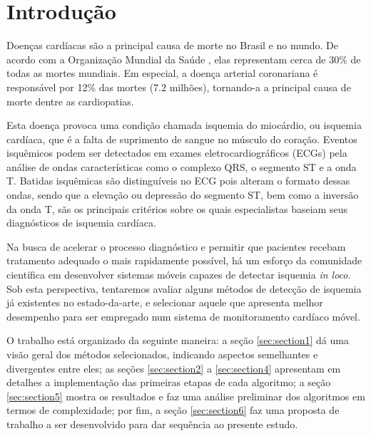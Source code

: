 
\section*{Introdução}
\label{sec:intro}

Doenças cardíacas são a principal causa de morte no Brasil e no mundo. De acordo com a Organização Mundial da Saúde \cite{Who04}, elas representam cerca de 30\% de todas as mortes mundiais. Em especial, a doença arterial coronariana é responsável por 12\% das mortes (7.2 milhões), tornando-a a principal causa de morte dentre as cardiopatias.

Esta doença provoca uma condição chamada isquemia do miocárdio, ou isquemia cardíaca, que é a falta de suprimento de sangue no músculo do coração. Eventos isquêmicos podem ser detectados em exames eletrocardiográficos (ECGs) pela análise de ondas características como o complexo QRS, o segmento ST e a onda T. Batidas isquêmicas são distinguíveis no ECG pois alteram o formato dessas ondas, sendo que a elevação ou depressão do segmento ST, bem como a inversão da onda T, sãs os principais critérios sobre os quais especialistas baseiam seus diagnósticos de isquemia cardíaca.

Na busca de acelerar o processo diagnóstico e permitir que pacientes recebam tratamento adequado o mais rapidamente possível, há um esforço da comunidade científica em desenvolver sistemas móveis capazes de detectar isquemia \emph{in loco}. Sob esta perspectiva, tentaremos avaliar alguns métodos de detecção de isquemia já existentes no estado-da-arte, e selecionar aquele que apresenta melhor desempenho para ser empregado num sistema de monitoramento cardíaco móvel.

O trabalho está organizado da seguinte maneira: a seção \ref{sec:section1} dá uma visão geral dos métodos selecionados, indicando aspectos semelhantes e divergentes entre eles; as seções \ref{sec:section2} a \ref{sec:section4} apresentam em detalhes a implementação das primeiras etapas de cada algoritmo; a seção \ref{sec:section5} mostra os resultados e faz uma análise preliminar dos algoritmos em termos de complexidade; por fim, a seção \ref{sec:section6} faz uma proposta de trabalho a ser desenvolvido para dar sequência ao presente estudo.
